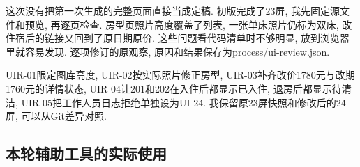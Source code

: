 \documentclass[cn,nofont,11pt,a4paper]{elegantpaper}
\begin{document}
这次没有把第一次生成的完整页面直接当成定稿. 初版完成了23屏, 我先固定源文件和预览, 再逐页检查. 房型页照片高度覆盖了列表, 一张单床照片仍标为双床, 改住宿后的链接又回到了原日期原价. 这些问题看代码清单时不够明显, 放到浏览器里就容易发现. 逐项修订的原观察, 原因和结果保存为process/ui-review.json.

UIR-01限定图库高度, UIR-02按实际照片修正房型, UIR-03补齐改价1780元与改期1760元的详情状态, UIR-04让201和202在入住后都显示已入住, 退房后都显示待清洁, UIR-05把工作人员日志拒绝单独设为UI-24. 我保留原23屏快照和修改后的24屏, 可以从Git差异对照.

\hypertarget{ux672cux8f6eux8f85ux52a9ux5de5ux5177ux7684ux5b9eux9645ux4f7fux7528}{%
\subsection{本轮辅助工具的实际使用}\label{ux672cux8f6eux8f85ux52a9ux5de5ux5177ux7684ux5b9eux9645ux4f7fux7528}}
\end{document}

